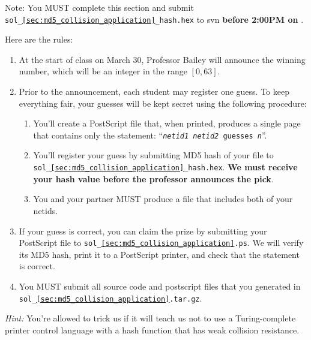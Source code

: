\documentclass[letterpaper,12pt]{report}
\begin{document}
\medskip

Note: You MUST complete this section and submit \texttt{sol\_\ref{sec:md5_collision_application}\_hash.hex} to svn {\bf before 2:00PM on \duedate}. 

\medskip

Here are the rules:
 
\begin{enumerate}

\item At the start of class on March 30, Professor Bailey will announce the winning number, which will be an integer in the range $[0,63]$.
 
\item Prior to the announcement, each student may register one guess.  To keep everything fair, your guesses will be kept secret using the following procedure:

\begin{enumerate}

\item You'll create a PostScript file that, when printed, produces a single page that contains only the statement: ``\texttt{\emph{netid1 netid2} guesses \emph{n}}''.
 
\item You'll register your guess by submitting MD5 hash of your file to \texttt{sol\_\ref{sec:md5_collision_application}\_hash.hex}.  \textbf{We must receive your hash value before the professor announces the pick}.

\item You and your partner MUST produce a file that includes both of your netids.

\end{enumerate}
 
\item If your guess is correct, you can claim the prize by submitting your PostScript file to \texttt{sol\_\ref{sec:md5_collision_application}.ps}.  We will verify its MD5 hash, print it to a PostScript printer, and check that the statement is correct.

\item You MUST submit all source code and postscript files that you generated in \texttt{sol\_\ref{sec:md5_collision_application}.tar.gz}.

\end{enumerate}
 
\emph{Hint:} You're allowed to trick us if it will teach us not to use a Turing-complete printer control language with a hash function that has weak collision resistance. \\
\end{document}
